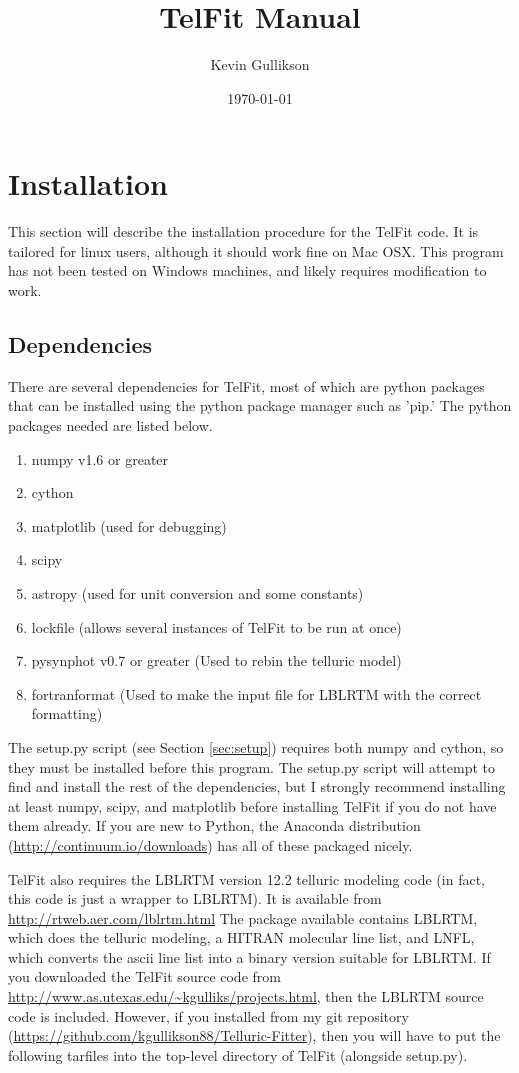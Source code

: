 \documentclass{article}
\begin{document}
\title{TelFit Manual}
\author{Kevin Gullikson}
\date{\today}
\maketitle



\section{Installation}
\label{sec:installation}
This section will describe the installation procedure for the TelFit code. It is tailored for linux users, although it should work fine on Mac OSX. This program has not been tested on Windows machines, and likely requires modification to work.
\subsection{Dependencies}
There are several dependencies for TelFit, most of which are python packages that can be installed using the python package manager such as 'pip.' The python packages needed are listed below.
\begin{enumerate}
\item numpy v1.6 or greater
\item cython     
\item matplotlib (used for debugging)
\item scipy
\item astropy    (used for unit conversion and some constants)
\item lockfile   (allows several instances of TelFit to be run at once)
\item pysynphot v0.7 or greater  (Used to rebin the telluric model)
\item fortranformat (Used to make the input file for LBLRTM with the correct formatting)
\end{enumerate}
The setup.py script (see Section \ref{sec:setup}) requires both numpy and cython, so they must be installed before this program. The setup.py script will attempt to find and install the rest of the dependencies, but I strongly recommend installing at least numpy, scipy, and matplotlib before installing TelFit if you do not have them already. If you are new to Python, the Anaconda distribution (\url{http://continuum.io/downloads}) has all of these packaged nicely.

TelFit also requires the LBLRTM version 12.2 telluric modeling code (in fact, this code is just a wrapper to LBLRTM). It is available from \url{http://rtweb.aer.com/lblrtm.html} The package available contains LBLRTM, which does the telluric modeling, a HITRAN molecular line list, and LNFL, which converts the ascii line list into a binary version suitable for LBLRTM. If you downloaded the TelFit source code from \url{http://www.as.utexas.edu/~kgulliks/projects.html}, then the LBLRTM source code is included. However, if you installed from my git repository (\url{https://github.com/kgullikson88/Telluric-Fitter}), then you will have to put the following tarfiles into the top-level directory of TelFit (alongside setup.py).
\end{document}
